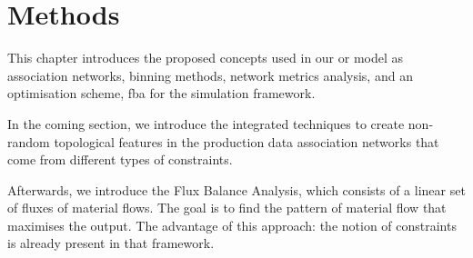 \chapter{Methods}
This chapter introduces the proposed concepts used in our \acs{or} model as association networks, binning methods, network metrics analysis, and an optimisation scheme, \acf{fba} for the simulation framework.

In the coming section, we introduce the integrated techniques to create non-random topological features in the production data association networks that come from different types of constraints. 

Afterwards, we introduce the Flux Balance Analysis, which consists of a linear set of fluxes of material flows. The goal is to find the pattern of material flow that maximises the output. The advantage of this approach: the notion of constraints is already present in that framework.



